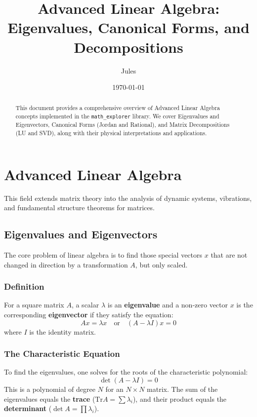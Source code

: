 \documentclass{article}
\title{Advanced Linear Algebra: Eigenvalues, Canonical Forms, and Decompositions}
\author{Jules}
\date{\today}
\begin{document}
\maketitle

\begin{abstract}
This document provides a comprehensive overview of Advanced Linear Algebra concepts implemented in the \texttt{math\_explorer} library. We cover Eigenvalues and Eigenvectors, Canonical Forms (Jordan and Rational), and Matrix Decompositions (LU and SVD), along with their physical interpretations and applications.
\end{abstract}

\section{Advanced Linear Algebra}

This field extends matrix theory into the analysis of dynamic systems, vibrations, and fundamental structure theorems for matrices.

\subsection{Eigenvalues and Eigenvectors}
The core problem of linear algebra is to find those special vectors $x$ that are not changed in direction by a transformation $A$, but only scaled.

\subsubsection{Definition}
For a square matrix $A$, a scalar $\lambda$ is an \textbf{eigenvalue} and a non-zero vector $x$ is the corresponding \textbf{eigenvector} if they satisfy the equation:
\[ Ax = \lambda x \quad \text{or} \quad (A - \lambda I)x = 0 \]
where $I$ is the identity matrix.

\subsubsection{The Characteristic Equation}
To find the eigenvalues, one solves for the roots of the characteristic polynomial:
\[ \det(A - \lambda I) = 0 \]
This is a polynomial of degree $N$ for an $N \times N$ matrix. The sum of the eigenvalues equals the \textbf{trace} ($\text{Tr} A = \sum \lambda_i$), and their product equals the \textbf{determinant} ($\det A = \prod \lambda_i$).
\end{document}
